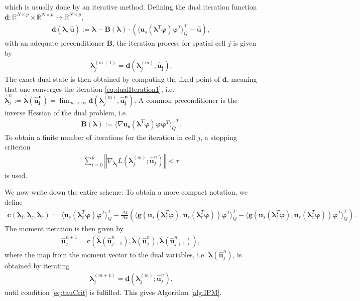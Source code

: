 which is usually done by an iterative method. Defining the dual iteration function $\bm{d}:\mathbb{R}^{N\times p}\times\mathbb{R}^{N\times p}\to\mathbb{R}^{N\times p}$,
\begin{align}\label{eq:dualIterationFunction}
\bm{d}(\bm{\lambda},\bm{\hat{u}}):= \bm{\lambda}-\bm{B}(\bm{\lambda})\cdot \left(\langle \bm u_{s}(\bm{\lambda}^T\bm{\varphi})\bm{\varphi}^T\rangle_Q^T-\bm{\hat{u}}\right),
\end{align}
with an adequate preconditioner $\bm{B}$, the iteration process for spatial cell $j$ is given by
\begin{align}\label{eq:dualIteration1}
\bm{\lambda}^{(m+1)}_j = \bm{d}(\bm{\lambda}_j^{(m)},\bm{\hat{u}_j}).
\end{align}
The exact dual state is then obtained by computing the fixed point of $\bm{d}$, meaning that one converges the iteration \eqref{eq:dualIteration1}, i.e. $\bm{\hat\lambda}_j^n:=\bm{\hat\lambda}(\bm{\hat u_j^n})=\lim_{m\rightarrow\infty}\bm{d}(\bm{\lambda}_j^{(m)},\bm{\hat{u}_j^n})$. A common preconditioner is the inverse Hessian of the dual problem, i.e.
\begin{align*}
\bm{B}(\bm{\lambda}) := \langle \nabla \bm{u}_{\bm{s}} (\bm{\lambda}^T\bm{\varphi})\bm{\varphi}\bm{\varphi}^T\rangle_Q^{-T}.
\end{align*}
To obtain a finite number of iterations for the iteration in cell $j$, a stopping criterion 
\begin{align}\label{eq:tauCrit}
\sum_{i=0}^p\left\Vert \nabla_{\bm{\lambda_i}}L(\bm{\lambda}_j^{(m)};\bm{\hat{u}}_j^n) \right\Vert < \tau
\end{align}
is used.

We now write down the entire scheme: To obtain a more compact notation, we define
\begin{align}\label{eq:momentIterationFunction}
\bm{c}\left(\bm{\lambda}_{\ell},\bm{\lambda}_c,\bm{\lambda}_r\right):= \langle \bm u_{s}(\bm{\lambda}_c^T\bm{\varphi})\bm{\varphi}^T\rangle_Q^T - \frac{\Delta t}{\Delta x}\left(\langle \bm g(\bm u_{s}(\bm{\lambda}_c^T\bm{\varphi}),\bm u_{s}(\bm{\lambda}_r^T\bm{\varphi}))\bm{\varphi}^T\rangle_Q^T-\langle \bm g(\bm u_{s}(\bm{\lambda}_{\ell}^T\bm{\varphi}),\bm u_{s}(\bm{\lambda}_c^T\bm{\varphi}))\bm{\varphi}^T\rangle_Q^T\right).
\end{align}
The moment iteration is then given by
\begin{align}\label{eq:momentIteration}
\bm{\hat u}_j^{n+1} = \bm{c}\left(\bm{\hat\lambda}(\bm{\hat u}_{j-1}^n),\bm{\hat\lambda}(\bm{\hat u}_{j}^n),\bm{\hat\lambda}(\bm{\hat u}_{j+1}^n)\right),
\end{align}
where the map from the moment vector to the dual variables, i.e. $\bm{\lambda}(\bm{\hat u}_{j}^n)$, is obtained by iterating
\begin{align}\label{eq:dualIteration}
\bm{\lambda}_j^{(m+1)} = \bm{d}(\bm{\lambda}_{j}^{(m)};\bm{\hat u}_j^{n}).
\end{align}
until condition \eqref{eq:tauCrit} is fulfilled. This gives Algorithm \ref{alg:IPM}.

